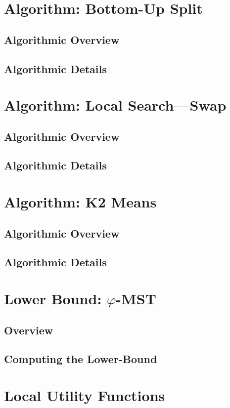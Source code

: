 \documentclass[11.5pt]{report}
\begin{document}
\section{Algorithm: Bottom-Up Split}  

\subsection{Algorithmic Overview}
\subsection{Algorithmic Details}\section{Algorithm: Local Search---Swap}  
\subsection{Algorithmic Overview}
\subsection{Algorithmic Details}
\section{Algorithm: K2 Means}  

\subsection{Algorithmic Overview}
\subsection{Algorithmic Details}

\section{Lower Bound: $\varphi$-MST}

\subsection{Overview}
\subsection{Computing the Lower-Bound}

\section{Local Utility Functions}
\end{document}
